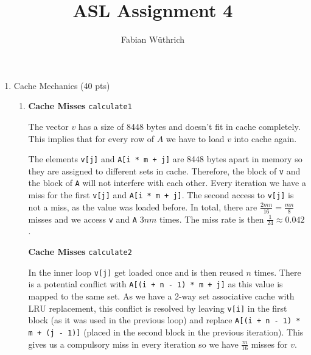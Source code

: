 \documentclass[a4paper]{article}
\title{ASL Assignment 4}
\author{Fabian Wüthrich}
\begin{document}
\maketitle

\begin{enumerate}
    \item Cache Mechanics (40 pts)
        \begin{enumerate}
            \item 
                \textbf{Cache Misses} \verb|calculate1| \vspace{1mm} 

                  The vector $v$ has a size of 8448 bytes and doesn't fit in
                  cache completely. This implies that for every row of $A$ we
                  have to load $v$ into cache again. 

                  The elements \verb|v[j]| and \verb|A[i * m + j]| are 8448
                  bytes apart in memory so they are assigned to different sets
                  in cache. Therefore, the block of \verb|v| and the block of
                  \verb|A| will not interfere with each other. Every 
                  iteration we have a miss for the first \verb|v[j]| and
                  \verb|A[i * m + j]|. The second access to \verb|v[j]| is not
                  a miss, as the value was loaded before. In total, there are
                  $\frac{2mn}{16}=\frac{mn}{8}$ misses and we access \verb|v|
                  and \verb|A| $3nm$ times. The miss rate is then
                  $\frac{1}{24} \approx 0.042$.
                  \vspace{1mm}

                  \textbf{Cache Misses} \verb|calculate2| \vspace{1mm}

                  In the inner loop \verb|v[j]| get loaded
                  once and is then reused $n$ times. There is a potential
                  conflict with \verb|A[(i + n - 1) * m + j]| as this value is
                  mapped to the same set. As we have a 2-way set associative
                  cache with LRU replacement, this conflict is resolved by
                  leaving \verb|v[i]| in the first block (as it was used in the
                  previous loop) and replace \verb|A[(i + n - 1) * m + (j - 1)]| 
                  (placed in the second block in the previous iteration). This 
                  gives us a compulsory miss in every  iteration so we
                  have $\frac{m}{16}$ misses for $v$.


\end{enumerate}
\end{enumerate}
\end{document}
